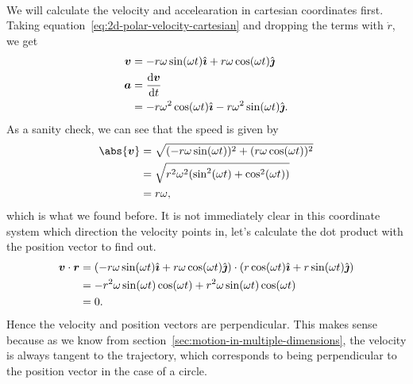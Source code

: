 \documentclass[../classical_mechanics.tex]{subfiles}
\begin{document}
        \paragraph{}
        We will calculate the velocity and accelearation in cartesian coordinates first.
        Taking equation~\ref{eq:2d-polar-velocity-cartesian} and dropping the terms with $\dot{r}$, we get
        \begin{align}
            \vec{v}&=-r\omega\sin(\omega t)\ihat+r\omega\cos(\omega t)\jhat\\
            \vec{a}&=\dv{\vec{v}}{t}\\
            &=-r\omega^2\cos(\omega t)\ihat-r\omega^2\sin(\omega t)\jhat.
        \end{align}
        As a sanity check, we can see that the speed is given by
        \begin{align}
            \abs{\vec{v}}&=\sqrt{(-r\omega\sin(\omega t))^2+(r\omega\cos(\omega t))^2}\\
            &=\sqrt{r^2\omega^2(\sin^2(\omega t)+\cos^2(\omega t))}\\
            &=r\omega,
        \end{align}
        which is what we found before.
        It is not immediately clear in this coordinate system which direction the velocity points in, let's calculate the dot product with the position vector to find out.
        \begin{align}
            \boldsymbol{v}\cdot\boldsymbol{r}&=(-r\omega\sin(\omega t)\hat{\boldsymbol{\imath}}+r\omega\cos(\omega t)\hat{\boldsymbol{\jmath}})\cdot(r\cos(\omega t)\hat{\boldsymbol{\imath}}+r\sin(\omega t)\hat{\boldsymbol{\jmath}})\\
            &=-r^2\omega\sin(\omega t)\cos(\omega t)+r^2\omega\sin(\omega t)\cos(\omega t)\\
            &=0.
        \end{align}
        Hence the velocity and position vectors are perpendicular.
        This makes sense because as we know from section~\ref{sec:motion-in-multiple-dimensions}, the velocity is always tangent to the trajectory, which corresponds to being perpendicular to the position vector in the case of a circle.
\end{document}
